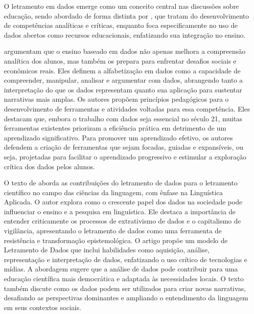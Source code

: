 \documentclass[portuguese]{textolivre}
\begin{document}
O letramento em dados emerge como um conceito central nas discussões sobre educação, sendo abordado de forma distinta por \textcite{bhargava2015,lima-lopes2023}, que tratam do desenvolvimento de competências analíticas e críticas, enquanto \textcite{coughlan2019} foca especificamente no uso de dados abertos como recursos educacionais, enfatizando sua integração no ensino.

\textcite{bhargava2015} argumentam que o ensino baseado em dados não apenas melhora a compreensão analítica dos alunos, mas também os prepara para enfrentar desafios sociais e econômicos reais. Eles definem a alfabetização em dados como a capacidade de compreender, manipular, analisar e argumentar com dados, abrangendo tanto a interpretação do que os dados representam quanto sua aplicação para sustentar narrativas mais amplas. Os autores propõem princípios pedagógicos para o desenvolvimento de ferramentas e atividades voltadas para essa competência. Eles destacam que, embora o trabalho com dados seja essencial no século 21, muitas ferramentas existentes priorizam a eficiência prática em detrimento de um aprendizado significativo. Para promover um aprendizado efetivo, os autores defendem a criação de ferramentas que sejam focadas, guiadas e expansíveis, ou seja, projetadas para facilitar o aprendizado progressivo e estimular a exploração crítica dos dados pelos alunos. 

O texto de \textcite{lima-lopes2023} aborda as contribuições do letramento de dados para o letramento científico no campo das ciências da linguagem, com ênfase na Linguística Aplicada. O autor explora como o crescente papel dos dados na sociedade pode influenciar o ensino e a pesquisa em linguística. Ele destaca a importância de entender criticamente os processos de extrativismo de dados e o capitalismo de vigilância, apresentando o letramento de dados como uma ferramenta de resistência e transformação epistemológica. O artigo propõe um modelo de Letramento de Dados que inclui habilidades como aquisição, análise, representação e interpretação de dados, enfatizando o uso crítico de tecnologias e mídias. A abordagem sugere que a análise de dados pode contribuir para uma educação científica mais democrática e adaptada às necessidades locais. O texto também discute como os dados podem ser utilizados para criar novas narrativas, desafiando as perspectivas dominantes e ampliando o entendimento da linguagem em seus contextos sociais.
\end{document}
